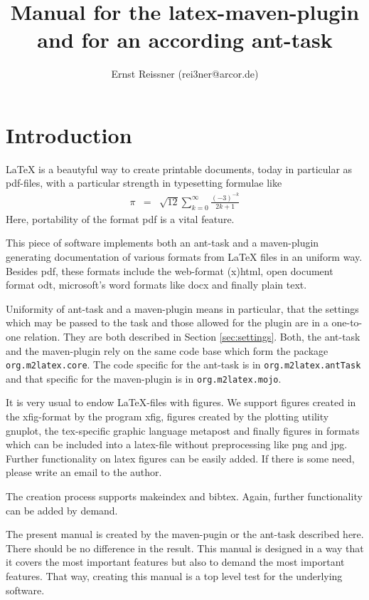 \documentclass[12pt]{article}
\title{Manual for the latex-maven-plugin and for an according ant-task }
\author{Ernst Reissner (rei3ner@arcor.de)}
\begin{document}
\maketitle

\tableofcontents
\listoffigures
\listoftables


\section{Introduction}

LaTeX is a beautyful way to create printable documents, 
today in particular as pdf-files, 
with a particular strength in typesetting formulae like 
%
\begin{eqnarray*}
\pi & = & \sqrt{12}\sum^\infty_{k=0} \frac{ (-3)^{-k} }{ 2k+1 }
\end{eqnarray*}
%
Here, portability of the format \gls{pdf} is a vital feature. 

This piece of software implements both an ant-task and a maven-plugin 
generating documentation of various formats from LaTeX files 
in an uniform way. 
Besides pdf, these formats include the web-format (x)html, 
open document format odt, microsoft's word formats like docx 
and finally plain text. 

Uniformity of ant-task and a maven-plugin means in particular, 
that the settings which may be passed to the task 
and those allowed for the plugin are in a one-to-one relation. 
They are both described in Section \ref{sec:settings}. 
Both, the ant-task and the maven-plugin rely on the same code base 
which form the package {\tt org.m2latex.core}. 
The code specific for the ant-task is in {\tt org.m2latex.antTask} 
and that specific for the maven-plugin is in {\tt org.m2latex.mojo}. 

It is very usual to endow LaTeX-files with figures. 
We support figures created in the xfig-format by the program xfig, 
figures created by the plotting utility gnuplot, 
the tex-specific graphic language metapost 
and finally figures in formats which can be included into a latex-file 
without preprocessing like png and jpg. 
Further functionality on latex figures can be easily added. 
If there is some need, please write an email to the author. 

The creation process supports makeindex and bibtex. 
Again, further functionality can be added by demand. 

The present manual is created by the maven-pugin or the ant-task 
described here. 
There should be no difference in the result. 
This manual is designed in a way that it covers the most important features 
but also to demand the most important features. 
That way, creating this manual is a top level test 
for the underlying software. 
\end{document}
